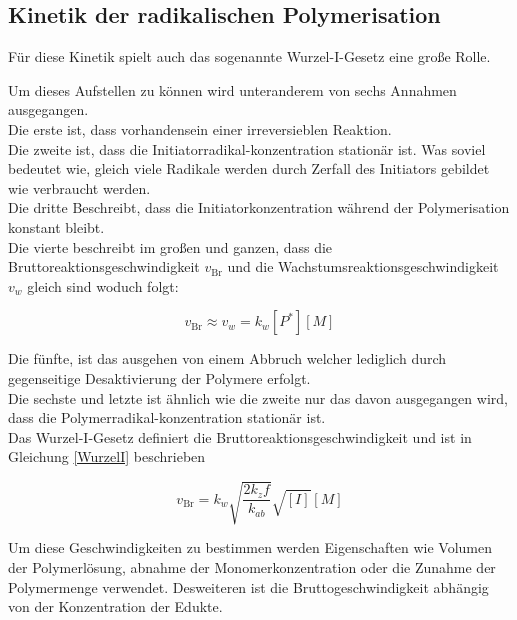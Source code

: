 \documentclass[10pt,a4paper,ngerman]{scrartcl}
\begin{document}
\subsection{Kinetik der radikalischen Polymerisation}
	Für diese Kinetik spielt auch das sogenannte Wurzel-I-Gesetz eine große Rolle. 
		
	Um dieses Aufstellen zu können wird unteranderem von sechs Annahmen ausgegangen.\\
	
	Die erste ist, dass vorhandensein einer irreversieblen Reaktion.\\
	
	Die zweite ist, dass die Initiatorradikal-konzentration stationär ist. 
	Was soviel bedeutet wie, gleich viele Radikale werden durch Zerfall des Initiators gebildet wie verbraucht werden.\\

	Die dritte Beschreibt, dass die Initiatorkonzentration während der Polymerisation konstant bleibt.\\

	Die vierte beschreibt im großen und ganzen, dass die Bruttoreaktionsgeschwindigkeit $v_\text{Br}$ und die Wachstumsreaktionsgeschwindigkeit $v_w$ gleich sind woduch folgt:

		\begin{equation}
			v_\text{Br} \approx v_w = k_w [P^*][M]
		\end{equation}

	Die fünfte, ist das ausgehen von einem Abbruch welcher lediglich durch gegenseitige Desaktivierung der Polymere erfolgt.\\

	Die sechste und letzte ist ähnlich wie die zweite nur das davon ausgegangen wird, dass die Polymerradikal-konzentration stationär ist.\\

	Das Wurzel-I-Gesetz definiert die Bruttoreaktionsgeschwindigkeit und ist in Gleichung \ref{WurzelI} beschrieben

		\begin{equation}
			v_\text{Br} = k_w \sqrt{\frac{2k_z f}{k_{ab}}}\sqrt{[I]}[M]
			\label{WurzelI}
		\end{equation}

	Um diese Geschwindigkeiten zu bestimmen werden Eigenschaften wie Volumen der Polymerlösung, 
	abnahme der Monomerkonzentration oder die Zunahme der Polymermenge verwendet. 
	Desweiteren ist die Bruttogeschwindigkeit abhängig von der Konzentration der Edukte.\\
\end{document}
